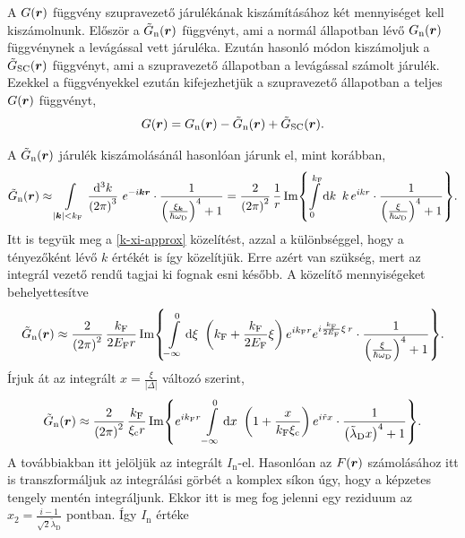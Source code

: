 \documentclass[a4paper,12pt,titlepage]{article}
\newcommand{\KK}{{\vb*{k}}}
\newcommand{\RR}{{\vb*{r}}}
\newcommand{\kF}{{k_\text{F}}}
\newcommand{\EF}{{E_\text{F}}}
\begin{document}
A $G(\RR)$ függvény szupravezető járulékának kiszámításához két mennyiséget kell kiszámolnunk.  Először a $\tilde{G}_\text{n}(\RR)$ függvényt, ami a normál állapotban lévő $G_\text{n}(\RR)$ függvénynek a levágással vett járuléka.  Ezután hasonló módon kiszámoljuk a $\tilde{G}_\text{SC}(\RR)$ függvényt, ami a szupravezető állapotban a levágással számolt járulék.  Ezekkel a függvényekkel ezután kifejezhetjük a szupravezető állapotban a teljes $G(\RR)$ függvényt,
\begin{equation}
	G(\RR) = G_\text{n}(\RR) - \tilde{G}_\text{n}(\RR) + \tilde{G}_\text{SC}(\RR).
\end{equation}

A $\tilde{G}_\text{n}(\RR)$ járulék kiszámolásánál hasonlóan járunk el, mint korábban,
\begin{equation}
	\tilde{G}_\text{n}(\RR) \approx \int\limits_{\left| \KK \right| < \kF} \frac{\dd[3]{k}}{\left( 2 \pi \right)^3} ~ e^{-i \KK \RR} \cdot \frac{1}{\left( \frac{\xi_\KK}{\hbar \omega_\text{D}} \right)^4 + 1} = \frac{2}{\left( 2 \pi \right)^2} \, \frac{1}{r} \Im{ \int\limits_0^{\kF} \dd{k} ~ k \, e^{i k r} \cdot \frac{1}{\left( \frac{\xi}{\hbar \omega_\text{D}} \right)^4 + 1} }.
\end{equation}
Itt is tegyük meg a \eqref{k-xi-approx} közelítést, azzal a különbséggel, hogy a tényezőként lévő $k$ értékét is így közelítjük.  Erre azért van szükség, mert az integrál vezető rendű tagjai ki fognak esni később.  A közelítő mennyiségeket behelyettesítve
\begin{equation}
	\tilde{G}_\text{n}(\RR) \approx \frac{2}{\left( 2 \pi \right)^2} \, \frac{\kF}{2 \EF r} \Im{ \int\limits_{-\infty}^0 \dd{\xi} ~ \left( \kF + \frac{\kF}{2 \EF} \xi \right) e^{i \kF r} e^{i \frac{\kF}{2 \EF} \xi \, r} \cdot \frac{1}{\left( \frac{\xi}{\hbar \omega_\text{D}} \right)^4 + 1} }.
\end{equation}
Írjuk át az integrált $x = \frac{\xi}{\left| \Delta \right|}$ változó szerint,
\begin{equation}
	\tilde{G}_\text{n}(\RR) \approx \frac{2}{\left( 2 \pi \right)^2} \, \frac{\kF}{\xi_\text{c} r} \Im{ e^{i \kF r} \int\limits_{-\infty}^0 \dd{x} ~ \left( 1 + \frac{x}{\kF \xi_\text{c}} \right) e^{i \tilde{r} x} \cdot \frac{1}{\left( \tilde{\lambda}_\text{D} x \right)^4 + 1} }.
\end{equation}
A továbbiakban itt jelöljük az integrált $I_\text{n}$-el.  Hasonlóan az $F(\RR)$ számolásához itt is transzformáljuk az integrálási görbét a komplex síkon úgy, hogy a képzetes tengely mentén integráljunk.  Ekkor itt is meg fog jelenni egy reziduum az $x_2 = \frac{i - 1}{\sqrt{2} \tilde{\lambda}_\text{D}}$ pontban.  Így $I_\text{n}$ értéke
\end{document}
